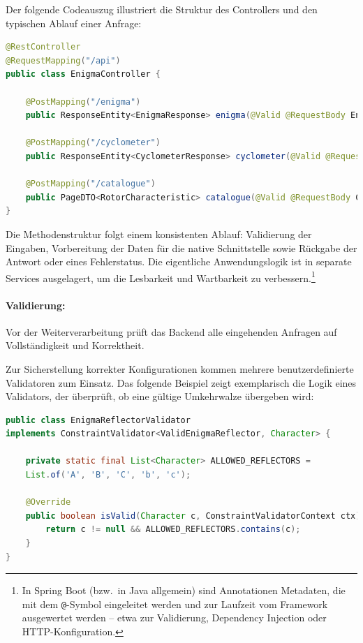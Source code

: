 \documentclass[12pt, ngerman, a4paper, numbers=noenddot]{article}
\begin{document}
Der folgende Codeauszug illustriert die Struktur des Controllers und den typischen Ablauf einer Anfrage:

\begin{lstlisting}[language=Java, caption={Ausschnitt aus dem EnigmaController}, label=lst:enigma-controller]
@RestController
@RequestMapping("/api")
public class EnigmaController {
	
	@PostMapping("/enigma")
	public ResponseEntity<EnigmaResponse> enigma(@Valid @RequestBody EnigmaRequest req) {...}
	
	@PostMapping("/cyclometer")
	public ResponseEntity<CyclometerResponse> cyclometer(@Valid @RequestBody ManualCyclometerRequest req) {...}
	
	@PostMapping("/catalogue")
	public PageDTO<RotorCharacteristic> catalogue(@Valid @RequestBody CatalogueRequest req) {...}
}
\end{lstlisting}

Die Methodenstruktur folgt einem konsistenten Ablauf: Validierung der Eingaben, Vorbereitung der Daten für die native Schnittstelle sowie Rückgabe der Antwort oder eines Fehlerstatus. Die eigentliche Anwendungslogik ist in separate Services ausgelagert, um die Lesbarkeit und Wartbarkeit zu verbessern.\footnote{%
	In Spring Boot (bzw.\ in Java allgemein) sind Annotationen Metadaten, die mit dem \lstinline|@|-Symbol eingeleitet werden und zur Laufzeit vom Framework ausgewertet werden – etwa zur Validierung, Dependency Injection oder HTTP-Konfiguration.%
}





\paragraph{Validierung:}

Vor der Weiterverarbeitung prüft das Backend alle eingehenden Anfragen auf Vollständigkeit und Korrektheit.

Zur Sicherstellung korrekter Konfigurationen kommen mehrere benutzerdefinierte Validatoren zum Einsatz. Das folgende Beispiel zeigt exemplarisch die Logik eines Validators, der überprüft, ob eine gültige Umkehrwalze übergeben wird:

\begin{lstlisting}[language=Java, caption={Validierung zulässiger Umkehrwalzen}, label=lst:reflector-validator]
public class EnigmaReflectorValidator 
implements ConstraintValidator<ValidEnigmaReflector, Character> {
	
	private static final List<Character> ALLOWED_REFLECTORS = 
	List.of('A', 'B', 'C', 'b', 'c');
	
	@Override
	public boolean isValid(Character c, ConstraintValidatorContext ctx) {
		return c != null && ALLOWED_REFLECTORS.contains(c);
	}
}
\end{lstlisting}
\end{document}
